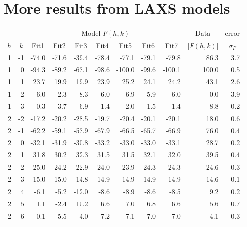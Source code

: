 \section{More results from LAXS models}
\begin{table}
  \centering
\begin{tabular}{rrrrrrrrrrr}
\hline
& & \multicolumn{7}{c}{Model $F(h,k)$} & \multicolumn{1}{c}{Data} & \multicolumn{1}{c}{error} \\
\cline{3-9}
\multicolumn{1}{c}{$h$} & \multicolumn{1}{c}{$k$} & \multicolumn{1}{c}{Fit1} & \multicolumn{1}{c}{Fit2} & \multicolumn{1}{c}{Fit3} & \multicolumn{1}{c}{Fit4} & \multicolumn{1}{c}{Fit5} & \multicolumn{1}{c}{Fit6} & \multicolumn{1}{c}{Fit7} & \multicolumn{1}{c}{$|F(h,k)|$} & \multicolumn{1}{c}{$\sigma_F$} \\ 
\hline
1 & -1 & -74.0 & -71.6 & -39.4 & -78.4 & -77.1 & -79.1 & -79.8 & 86.3 & 3.7 \\ 
1 & 0 & -94.3 & -89.2 & -63.1 & -98.6 & -100.0 & -99.6 & -100.1 & 100.0 & 0.5 \\ 
1 & 1 & 23.7 & 19.9 & 19.9 & 23.9 & 25.2 & 24.1 & 24.2 & 43.1 & 2.6 \\ 
1 & 2 & -6.0 & -2.3 & -8.3 & -6.0 & -6.9 & -5.9 & -6.0 & 0.0 & 3.9 \\ 
1 & 3 & 0.3 & -3.7 & 6.9 & 1.4 & 2.0 & 1.5 & 1.4 & 8.8 & 0.2 \\ 
2 & -2 & -17.2 & -20.2 & -28.5 & -19.7 & -20.4 & -20.1 & -20.1 & 18.0 & 0.6 \\ 
2 & -1 & -62.2 & -59.1 & -53.9 & -67.9 & -66.5 & -65.7 & -66.9 & 76.0 & 0.4 \\ 
2 & 0 & -32.1 & -31.9 & -30.8 & -33.2 & -33.0 & -33.0 & -33.1 & 28.7 & 0.2 \\ 
2 & 1 & 31.8 & 30.2 & 32.3 & 31.5 & 31.5 & 32.1 & 32.0 & 39.5 & 0.4 \\ 
2 & 2 & -25.0 & -24.2 & -22.9 & -24.0 & -23.9 & -24.3 & -24.3 & 24.6 & 0.3 \\ 
2 & 3 & 15.0 & 15.0 & 14.8 & 14.9 & 14.9 & 14.9 & 14.9 & 14.6 & 0.1 \\ 
2 & 4 & -6.1 & -5.2 & -12.0 & -8.6 & -8.9 & -8.6 & -8.5 & 9.2 & 0.2 \\ 
2 & 5 & 1.1 & -2.4 & 10.2 & 6.6 & 7.0 & 6.8 & 6.6 & 5.6 & 0.7 \\ 
2 & 6 & 0.1 & 5.5 & -4.0 & -7.2 & -7.1 & -7.0 & -7.0 & 4.1 & 0.3 \\ 

\end{tabular}
\end{table}
